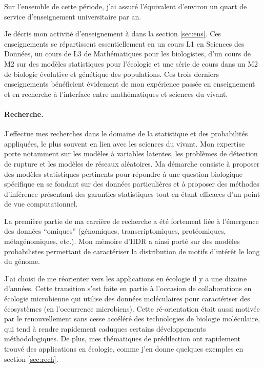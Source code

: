 Sur l'ensemble de cette période, j'ai assuré l'équivalent d'environ un quart de service d'enseignement universitaire par an.

\bigskip
Je décris mon activité d’enseignement à \SU dans la section \ref{sec:ens}. Ces enseignements se répartissent essentiellement en un cours L1 en Sciences des Données, un cours de L3 de Mathématiques pour les biologistes, d’un cours de M2 sur des modèles statistiques pour l’écologie et une série de cours dans un M2 de biologie évolutive et génétique des populations. Ces trois derniers enseignements bénéficient évidement de mon expérience passée en enseignement et en recherche à l’interface entre mathématiques et sciences du vivant.

\paragraph{Recherche.}
J’effectue mes recherches dans le domaine de la statistique et des probabilités appliquées, le plus souvent en lien avec les sciences du vivant. Mon expertise porte notamment sur les modèles à variables latentes, les problèmes de détection de rupture et les modèles de réseaux aléatoires. Ma démarche consiste à proposer des modèles statistiques pertinents pour répondre à une question biologique spécifique en se fondant sur des données particulières et à proposer des méthodes d’inférence présentant des garanties statistiques tout en étant efficaces d’un point de vue computationnel.

\bigskip
La première partie de ma carrière de recherche a été fortement liée à l’émergence des données “omiques” (génomiques, transcriptomiques, protéomiques, métagénomiques, etc.). Mon mémoire d’HDR a ainsi porté sur des modèles probabilistes permettant de caractériser la distribution de motifs d'intérêt le long du génome.

\bigskip
J’ai choisi de me réorienter vers les applications en écologie il y a une dizaine d’années. Cette transition s’est faite en partie à l’occasion de collaborations en écologie microbienne qui utilise des données moléculaires pour caractériser des écosystèmes (en l'occurrence microbiens). Cette ré-orientation était aussi motivée par le renouvellement sans cesse accéléré des technologies de biologie moléculaire, qui tend à rendre rapidement caduques certains développements méthodologiques. De plus, mes thématiques de prédilection ont rapidement trouvé des applications en écologie, comme j’en donne quelques exemples en section \ref{sec:rech}.

